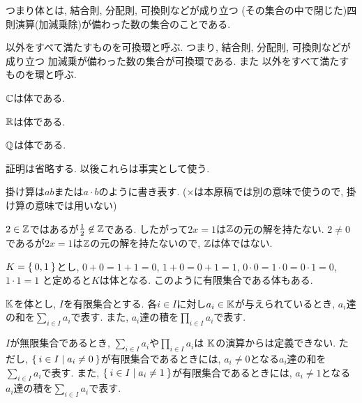 \begin{remark}
  つまり体とは,
  結合則, 分配則, 可換則などが成り立つ
  (その集合の中で閉じた)四則演算(加減乗除)が備わった数の集合のことである.
\end{remark}
\begin{remark}
以外をすべて満たすものを可換環と呼ぶ.
つまり,
  結合則, 分配則, 可換則などが成り立つ
  加減乗が備わった数の集合が可換環である.
  また
以外をすべて満たすものを環と呼ぶ.
\end{remark}

\begin{example}
  $\mathbb{C}$は体である.
\end{example}
\begin{example}
  $\mathbb{R}$は体である.
\end{example}
\begin{example}
  $\mathbb{Q}$は体である.
\end{example}
\begin{remark}
  証明は省略する.
  以後これらは事実として使う.
\end{remark}
\begin{remark}
  掛け算は$ab$または$a\cdot b$のように書き表す.
  ($\times$は本原稿では別の意味で使うので,
  掛け算の意味では用いない)
\end{remark}

\begin{example}
  $2\in\mathbb{Z}$ではあるが$\frac{1}{2}\not\in \mathbb{Z}$である.
  したがって$2x=1$は$\mathbb{Z}$の元の解を持たない.
  $2\neq 0$であるが$2x=1$は$\mathbb{Z}$の元の解を持たないので,
  $\mathbb{Z}$は体ではない.
\end{example}

\begin{example}
\label{ex:f2}
$K=\Set{0,1}$とし,
$0+0=1+1=0$, $1+0=0+1=1$,
$0\cdot 0=1\cdot 0=0\cdot 1=0$, $1\cdot 1=1$
と定めると$K$は体となる.
このように有限集合である体もある.
\end{example}

$\mathbb{K}$を体とし,
$I$を有限集合とする.
各$i\in I$に対し$a_i\in \mathbb{K}$が与えられているとき,
$a_i$達の和を$\sum_{i\in I} a_i$で表す.
また,
$a_i$達の積を$\prod_{i\in I} a_i$で表す.

\begin{remark}
$I$が無限集合であるとき,
$\sum_{i\in I} a_i$や$\prod_{i\in I} a_i$は
$\mathbb{K}$の演算からは定義できない.
ただし,
$\Set{i \in I |a_i\neq 0}$が有限集合であるときには,
$a_i\neq 0$となる$a_i$達の和を$\sum_{i\in I} a_i$で表す.
また,
$\Set{i \in I |a_i\neq 1}$が有限集合であるときには,
$a_i\neq 1$となる$a_i$達の積を$\sum_{i\in I} a_i$で表す.
\end{remark}

